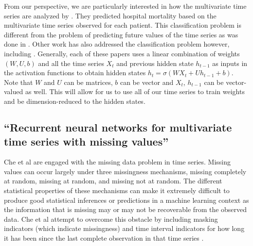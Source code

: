 \documentclass[conference]{IEEEtran}
\begin{document}
    

From our perspective, we are particularly interested in how the multivariate time series are analyzed by \cite{tanDATAGRUDualAttentionTimeAware2020}. They predicted hospital mortality based on the multivariate time series observed for each patient. This classification problem is different from the problem of predicting future values of the time series as was done in \cite{dingModelingExtremeEvents2019, zhangEnhancingTimeSeries2021, chungEmpiricalEvaluationGated2014}. Other work has also addressed the classification problem however, including \cite{cheRecurrentNeuralNetworks2018, zhangEnhancingTimeSeries2021}. Generally, each of these papers uses a linear combination of weights $(W, U, b)$ and all the time series $X_t$ and previous hidden state $h_{t-1}$ as inputs in the activation functions to obtain hidden states $h_t = \sigma(W X_t + U h_{t-1} + b)$. Note that $W$ and $U$ can be matrices, $b$ can be vector and $X_t$, $h_{t-1}$ can be vector-valued as well. This will allow for us to use all of our time series to train weights and be dimension-reduced to the hidden states. 

\subsection{“Recurrent neural networks for multivariate time series with missing values” \cite{cheRecurrentNeuralNetworks2018}}

Che et al are engaged with the missing data problem in time series. Missing values can occur largely under three missingness mechanisms, missing completely at random, missing at random, and missing not at random. The different statistical properties of these mechanisms can make it extremely difficult to produce good statistical inferences or predictions in a machine learning context as the information that is missing may or may not be recoverable from the observed data. Che et al attempt to overcome this obstacle by including masking indicators (which indicate missingness) and time interval indicators for how long it has been since the last complete observation in that time series \cite{cheRecurrentNeuralNetworks2018}. 
\end{document}
